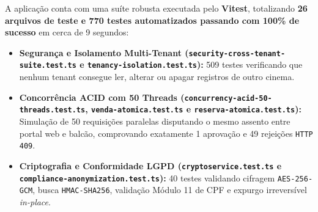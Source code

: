 
A aplicação conta com uma suíte robusta executada pelo \textbf{Vitest}, totalizando \textbf{26 arquivos de teste e 770 testes automatizados passando com 100\% de sucesso} em cerca de 9 segundos:

\begin{itemize}
\item \textbf{Segurança e Isolamento Multi-Tenant (\texttt{security-\allowbreak\hspace{0pt plus 1pt}cross-\allowbreak\hspace{0pt plus 1pt}tenant-\allowbreak\hspace{0pt plus 1pt}suite.\allowbreak\hspace{0pt plus 1pt}test.\allowbreak\hspace{0pt plus 1pt}ts} e \texttt{tenancy-\allowbreak\hspace{0pt plus 1pt}isolation.\allowbreak\hspace{0pt plus 1pt}test.\allowbreak\hspace{0pt plus 1pt}ts}):} 509 testes verificando que nenhum tenant consegue ler, alterar ou apagar registros de outro cinema.
\item \textbf{Concorrência ACID com 50 Threads (\texttt{concurrency-\allowbreak\hspace{0pt plus 1pt}acid-\allowbreak\hspace{0pt plus 1pt}50-\allowbreak\hspace{0pt plus 1pt}threads.\allowbreak\hspace{0pt plus 1pt}test.\allowbreak\hspace{0pt plus 1pt}ts}, \texttt{venda-\allowbreak\hspace{0pt plus 1pt}atomica.\allowbreak\hspace{0pt plus 1pt}test.\allowbreak\hspace{0pt plus 1pt}ts} e \texttt{reserva-\allowbreak\hspace{0pt plus 1pt}atomica.\allowbreak\hspace{0pt plus 1pt}test.\allowbreak\hspace{0pt plus 1pt}ts}):} Simulação de 50 requisições paralelas disputando o mesmo assento entre portal web e balcão, comprovando exatamente 1 aprovação e 49 rejeições \texttt{HTTP 409}.
\item \textbf{Criptografia e Conformidade LGPD (\texttt{cryptoservice.\allowbreak\hspace{0pt plus 1pt}test.\allowbreak\hspace{0pt plus 1pt}ts} e \texttt{compliance-\allowbreak\hspace{0pt plus 1pt}anonymization.\allowbreak\hspace{0pt plus 1pt}test.\allowbreak\hspace{0pt plus 1pt}ts}):} 40 testes validando cifragem \texttt{AES-\allowbreak\hspace{0pt plus 1pt}256-\allowbreak\hspace{0pt plus 1pt}GCM}, busca \texttt{HMAC-\allowbreak\hspace{0pt plus 1pt}SHA256}, validação Módulo 11 de CPF e expurgo irreversível \emph{in-place}.

\end{itemize}
